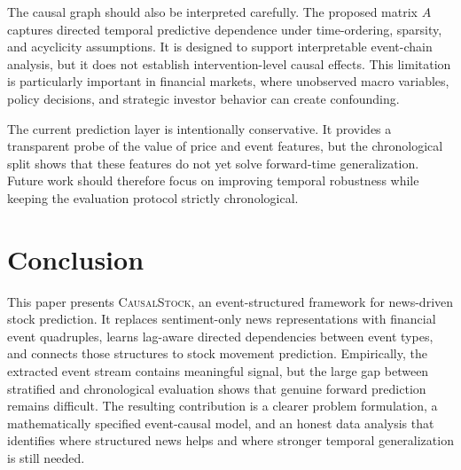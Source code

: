 \documentclass[sigconf,review]{acmart}
\begin{document}
The causal graph should also be interpreted carefully. The proposed matrix $A$ captures directed temporal predictive dependence under time-ordering, sparsity, and acyclicity assumptions. It is designed to support interpretable event-chain analysis, but it does not establish intervention-level causal effects. This limitation is particularly important in financial markets, where unobserved macro variables, policy decisions, and strategic investor behavior can create confounding.

The current prediction layer is intentionally conservative. It provides a transparent probe of the value of price and event features, but the chronological split shows that these features do not yet solve forward-time generalization. Future work should therefore focus on improving temporal robustness while keeping the evaluation protocol strictly chronological.

\section{Conclusion}

This paper presents \textsc{CausalStock}, an event-structured framework for news-driven stock prediction. It replaces sentiment-only news representations with financial event quadruples, learns lag-aware directed dependencies between event types, and connects those structures to stock movement prediction. Empirically, the extracted event stream contains meaningful signal, but the large gap between stratified and chronological evaluation shows that genuine forward prediction remains difficult. The resulting contribution is a clearer problem formulation, a mathematically specified event-causal model, and an honest data analysis that identifies where structured news helps and where stronger temporal generalization is still needed.



\end{document}
